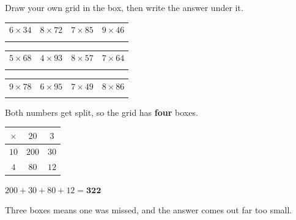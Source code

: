\documentclass[12pt,a4paper]{article}
\begin{document}

\noindent Draw your own grid in the box, then write the answer under it.

\vspace{4pt}
\noindent
\begin{tabularx}{\textwidth}{|X|X|X|X|}
  \hline
  $6 \times 34$ & $8 \times 72$ & $7 \times 85$ & $9 \times 46$ \\
  \rule[-3.0em]{0pt}{3.6em} & & & \\
  \hline
\end{tabularx}

\vspace{5pt}
\noindent
\begin{tabularx}{\textwidth}{|X|X|X|X|}
  \hline
  $5 \times 68$ & $4 \times 93$ & $8 \times 57$ & $7 \times 64$ \\
  \rule[-3.0em]{0pt}{3.6em} & & & \\
  \hline
\end{tabularx}

\vspace{5pt}
\noindent
\begin{tabularx}{\textwidth}{|X|X|X|X|}
  \hline
  $9 \times 78$ & $6 \times 95$ & $7 \times 49$ & $8 \times 86$ \\
  \rule[-3.0em]{0pt}{3.6em} & & & \\
  \hline
\end{tabularx}



\noindent Both numbers get split, so the grid has \textbf{four} boxes.

\begin{remember}
  \noindent
  \begin{minipage}[c]{0.40\linewidth}
    \renewcommand{\arraystretch}{1.9}%
    \begin{tabular}{|c|c|c|}
      \hline
      $\times$ & $20$  & $3$ \\ \hline
      $10$     & $200$ & $30$ \\ \hline
      $4$      & $80$  & $12$ \\ \hline
    \end{tabular}%
    \renewcommand{\arraystretch}{1.45}
  \end{minipage}%
  \begin{minipage}[c]{0.58\linewidth}
    $200 + 30 + 80 + 12 = \mathbf{322}$

    \smallskip
     Three boxes means
    one was missed, and the answer comes out far too small.
  \end{minipage}
\end{remember}
\end{document}
